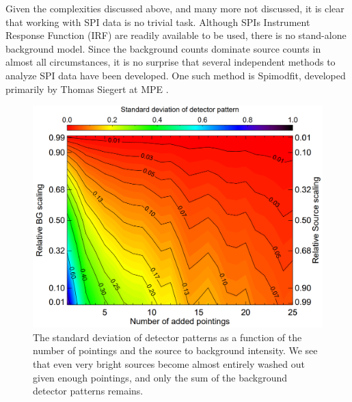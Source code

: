\documentclass{report}
\begin{document}
Given the complexities discussed above, and many more not discussed, it is clear that working with SPI data is no trivial task. Although SPIs Instrument Response Function (IRF) are readily available to be used, there is no stand-alone background model. Since the background counts dominate source counts in almost all circumstances, it is no surprise that several independent methods to analyze SPI data have been developed. One such method is Spimodfit, developed primarily by Thomas Siegert at MPE \cite{refId1} \cite{SMF_Cookbook}.

\begin{figure}
  \includegraphics[width=\linewidth]{Images/General/SMF_background_pattern_siegert_2019.PNG}
  \caption{The standard deviation of detector patterns as a function of the number of pointings and the source to background intensity. We see that even very bright sources become almost entirely washed out given enough pointings, and only the sum of the background detector patterns remains. \cite{refId1}}
  \vspace{-0pt}
  \label{smf_background_model_idea}
  \vspace{-5pt}
\end{figure}
\end{document}
